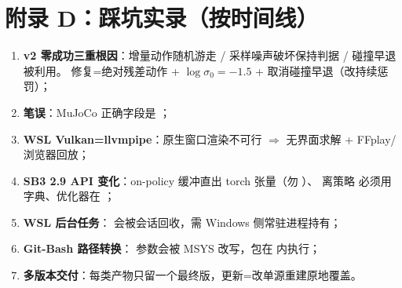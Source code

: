 \section{附录 D：踩坑实录（按时间线）}
\begin{enumerate}
  \item \textbf{v2 零成功三重根因}：增量动作随机游走 / 采样噪声破坏保持判据 / 碰撞早退被利用。
        修复=绝对残差动作 + $\log\sigma_0{=}-1.5$ + 取消碰撞早退（改持续惩罚）；
  \item \textbf{ 笔误}：MuJoCo 正确字段是 ；
  \item \textbf{WSL Vulkan=llvmpipe}：原生窗口渲染不可行 $\Rightarrow$ 无界面求解 + FFplay/浏览器回放；
  \item \textbf{SB3 2.9 API 变化}：on-policy 缓冲直出 torch 张量（勿 ）、
        离策略  必须用  字典、优化器在 ；
  \item \textbf{WSL 后台任务}： 会被会话回收，需 Windows 侧常驻进程持有；
  \item \textbf{Git-Bash 路径转换}： 参数会被 MSYS 改写，包在  内执行；
  \item \textbf{多版本交付}：每类产物只留一个最终版，更新=改单源重建原地覆盖。
\end{enumerate}
